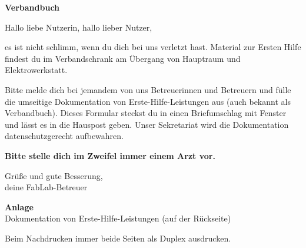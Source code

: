 \documentclass[a4paper,11pt]{scrartcl}
\begin{document}
\setlength{\parskip}{0.6em}
\vspace*{78mm}
{\large\bfseries Verbandbuch}

\bigskip
Hallo liebe Nutzerin, hallo lieber Nutzer,

es ist nicht schlimm, wenn du dich bei uns verletzt hast. Material zur Ersten Hilfe findest
du im Verbandschrank am Übergang von Hauptraum und Elektrowerkstatt.

Bitte melde dich bei jemandem von uns Betreuerinnen und Betreuern und fülle die umseitige
Dokumentation von Erste-Hilfe-Leistungen aus (auch bekannt als Verbandbuch). Dieses
Formular steckst du in einen Briefumschlag mit Fenster und lässt es in die Hauspost geben.
Unser Sekretariat wird die Dokumentation datenschutzgerecht aufbewahren.

\textbf{Bitte stelle dich im Zweifel immer einem Arzt vor.}

\bigskip
Grüße und gute Besserung,\\
deine FabLab-Betreuer

\bigskip
\textbf{Anlage}\\
Dokumentation von Erste-Hilfe-Leistungen (auf der Rückseite)

\vfill
{}

\medskip
{\footnotesize Beim Nachdrucken immer beide Seiten als Duplex ausdrucken.}
\newpage
\end{document}
